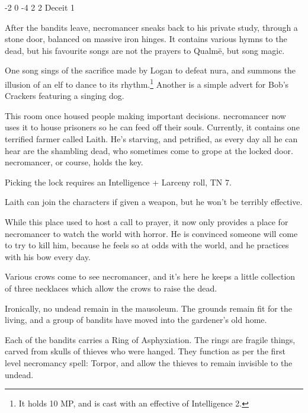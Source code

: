 \begin{multicols}{2}

{-2}%
{0}%
{-4}%
{2}%
{2}%
{Deceit 1}%
{\partialleather}%
{}%


After the bandits leave, \gls{necromancer} sneaks back to his private study, through a stone door, balanced on massive iron hinges.  It contains various hymns to the dead, but his favourite songs are not the prayers to Qualm\"{e}, but song magic.

One song sings of the sacrifice made by Logan to defeat nura, and summons the illusion of an elf to dance to its rhythm.\footnote{It holds 10 MP, and is cast with an effective of Intelligence 2.}
Another is a simple advert for Bob's Crackers featuring a singing dog.


This room once housed people making important decisions.  \Gls{necromancer} now uses it to house prisoners so he can feed off their souls.
Currently, it contains one terrified farmer called Laith.
He's starving, and petrified, as every day all he can hear are the shambling dead, who sometimes come to grope at the locked door.
\Gls{necromancer}, or course, holds the key.

Picking the lock requires an Intelligence + Larceny roll, TN 7.


Laith can join the characters if given a weapon, but he won't be terribly effective.

\humanfarmer


While this place used to host a call to prayer, it now only provides a place for \gls{necromancer} to watch the world with horror.  He is convinced someone will come to try to kill him, because he feels so at odds with the world, and he practices with his bow every day.

Various crows come to see \gls{necromancer}, and it's here he keeps a little collection of three necklaces which allow the crows to raise the dead.


Ironically, no undead remain in the mausoleum.  The grounds remain fit for the living, and a group of bandits have moved into the gardener's old home.

Each of the bandits carries a Ring of Asphyxiation.
The rings are fragile things, carved from skulls of thieves who were hanged.
They function as per the first level necromancy spell: Torpor, and allow the thieves to remain invisible to the undead.


\end{multicols}
